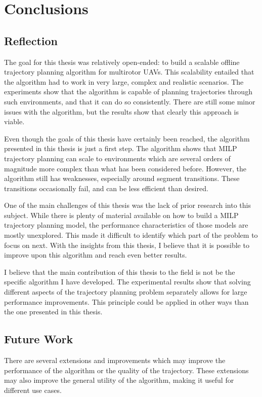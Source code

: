 

\chapter{Conclusions}
\label{section:conclusions}

\section{Reflection}
The goal for this thesis was relatively open-ended: to build a scalable offline trajectory planning algorithm for multirotor UAVs. This scalability entailed that the algorithm had to work in very large, complex and realistic scenarios. The experiments show that the algorithm is capable of planning trajectories through such environments, and that it can do so consistently. There are still some minor issues with the algorithm, but the results show that clearly this approach is viable.
\par
Even though the goals of this thesis have certainly been reached, the algorithm presented in this thesis is just a first step. The algorithm shows that MILP trajectory planning can scale to environments which are several orders of magnitude more complex than what has been considered before. However, the algorithm still has weaknesses, especially around segment transitions. These transitions occasionally fail, and can be less efficient than desired.
\par
One of the main challenges of this thesis was the lack of prior research into this subject. While there is plenty of material available on how to build a MILP trajectory planning model, the performance characteristics of those models are mostly unexplored. This made it difficult to identify which part of the problem to focus on next. With the insights from this thesis, I believe that it is possible to improve upon this algorithm and reach even better results.
\par
I believe that the main contribution of this thesis to the field is   not be the specific algorithm I have developed. The experimental results show that solving different aspects of the trajectory planning problem separately allows for large performance improvements. This principle could be applied in other ways than the one presented in this thesis.
\newpage
\section{Future Work}
\label{section:future}
There are several extensions and improvements which may improve the performance of the algorithm or the quality of the trajectory. These extensions may also improve the general utility of the algorithm, making it useful for different use cases.

